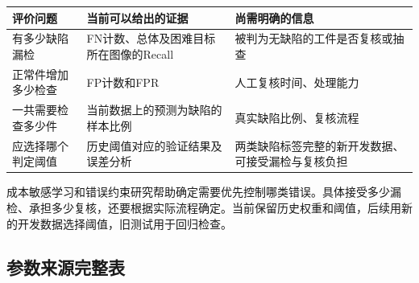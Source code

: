 \par\medskip\noindent\begin{minipage}{\linewidth}\small{}
\begin{tabular}{@{}>{\raggedright\arraybackslash}p{0.240\dimexpr\linewidth-4\tabcolsep\relax}>{\raggedright\arraybackslash}p{0.340\dimexpr\linewidth-4\tabcolsep\relax}>{\raggedright\arraybackslash}p{0.420\dimexpr\linewidth-4\tabcolsep\relax}@{}}
\toprule
评价问题 & 当前可以给出的证据 & 尚需明确的信息 \\
\midrule
有多少缺陷漏检 & FN计数、总体及困难目标所在图像的Recall & 被判为无缺陷的工件是否复核或抽查 \\
正常件增加多少检查 & FP计数和FPR & 人工复核时间、处理能力 \\
一共需要检查多少件 & 当前数据上的预测为缺陷的样本比例 & 真实缺陷比例、复核流程 \\
应选择哪个判定阈值 & 历史阈值对应的验证结果及误差分析 & 两类缺陷标签完整的新开发数据、可接受漏检与复核负担 \\
\bottomrule\end{tabular}\end{minipage}\par\medskip

成本敏感学习和错误约束研究\cite{ref5}\cite{ref6}帮助确定需要优先控制哪类错误。具体接受多少漏检、承担多少复核，还要根据实际流程确定。当前保留历史权重和阈值，后续用新的开发数据选择阈值，旧测试用于回归检查。

\FloatBarrier{}\subsection{参数来源完整表}

